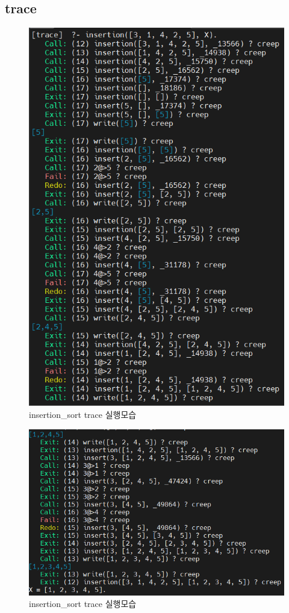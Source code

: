 \documentclass{article}
\begin{document}
\subsection{trace}
\begin{figure}[h]
    \centering
    \includegraphics[scale = 0.7]{traceinsert1.png}
    \caption{insertion\_sort trace 실행모습}
\end{figure}
\begin{figure}[h]
    \centering
    \includegraphics[scale = 0.7]{traceinsert2.png}
    \caption{insertion\_sort trace 실행모습}
\end{figure}
\end{document}
